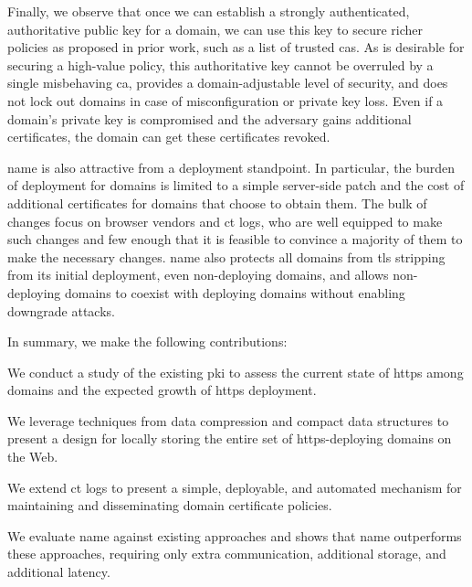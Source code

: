 Finally, we observe that once we can establish a strongly authenticated,
authoritative public key for a domain, we can use this key to secure richer
policies as proposed in prior work, such as a list of trusted \acp{ca}. As is
desirable for securing a high-value policy, this authoritative key cannot be
overruled by a single misbehaving \ac{ca}, provides a domain-adjustable level of
security, and does not lock out domains in case of misconfiguration or private
key loss. Even if a domain's private key is compromised and the adversary gains
additional certificates, the domain can get these certificates revoked.

\ac{name} is also attractive from a deployment standpoint. In particular, the
burden of deployment for domains is limited to a simple server-side patch and
the cost of additional certificates for domains that choose to obtain them. The
bulk of changes focus on browser vendors and \ac{ct} logs, who are well equipped
to make such changes and few enough that it is feasible to convince a majority
of them to make the necessary changes. \ac{name} also protects all domains from
\ac{tls} stripping from its initial deployment, even non-deploying domains, and
allows non-deploying domains to coexist with deploying domains without enabling
downgrade attacks.

In summary, we make the following contributions:
\begin{compactitem}
\item We conduct a study of the existing \ac{pki} to assess the current state of
  \ac{https} among domains and the expected growth of \ac{https} deployment.
\item We leverage techniques from data compression and compact data structures
  to present a design for locally storing the entire set of \ac{https}-deploying
  domains on the Web.
\item We extend \ac{ct} logs to present a simple, deployable, and automated
  mechanism for maintaining and disseminating domain certificate policies.
\item We evaluate \ac{name} against existing approaches and shows that
  \ac{name} outperforms these approaches, requiring only \steve{} extra
  communication, \steve{} additional storage, and \steve{} additional latency.
\end{compactitem}




